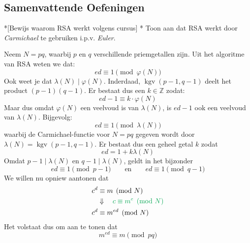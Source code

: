 \subsection{Samenvattende Oefeningen}

\begin{niceexercise}*[Bewijs waarom RSA werkt volgens cursus]\label{ex:l7_rsa-alternatief}
    \nextpart[]*
    Toon aan dat RSA werkt door \emph{Carmichael} te gebruiken i.p.v. \emph{Euler}.
\end{niceexercise}

Neem $N = pq$, waarbij $p$ en $q$ verschillende priemgetallen zijn. Uit het algoritme van RSA weten we dat:
\begin{equation*}
    ed \equiv 1 \pmod {\varphi(N)}
\end{equation*}
Ook weet je dat $\lambda(N) \mid \varphi(N)$. Inderdaad, $\operatorname{kgv}\left(p-1, q-1\right)$ deelt het product $(p-1)(q-1)$. Er bestaat dus een $k \in \mathbb{Z}$ zodat:
\begin{equation*}
    ed - 1 \equiv k \cdot \varphi(N)
\end{equation*}
Maar dus omdat $\varphi(N)$ een veelvoud is van $\lambda(N)$, is $ed - 1$ ook een veelvoud van $\lambda(N)$. Bijgevolg:
\begin{equation*}
    ed \equiv 1 \pmod {\lambda(N)}
\end{equation*}
waarbij de Carmichael-functie voor $N = pq$ gegeven wordt door $\lambda(N) = \operatorname{kgv}\left(p-1, q-1\right)$. Er bestaat dus een geheel getal $k$ zodat
\begin{equation*}
    ed = 1 + k\lambda(N)
\end{equation*}
Omdat $p-1 \mid \lambda(N)$ en $q-1 \mid \lambda(N)$, geldt in het bijzonder
\begin{equation*}
    ed \equiv 1 \pmod {p-1} \qquad \text{en} \qquad ed \equiv 1 \pmod {q-1}
\end{equation*}
We willen nu opniew aantonen dat
\begin{equation*}
    \begin{aligned}
        c^d &\equiv m \pmod N \\
        &\Downarrow \textcolor{Green}{\quad c \equiv m^e \pmod N} \\
        c^d &\equiv m^{ed} \pmod N
    \end{aligned}
\end{equation*}
Het volstaat dus om aan te tonen dat
\begin{equation*}
    m^{ed} \equiv m \pmod {pq}
\end{equation*}
